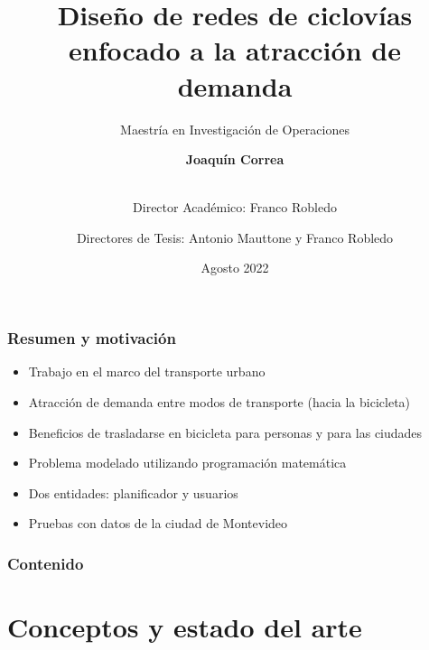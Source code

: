 \documentclass[aspectratio=43, 10pt]{beamer}
\title{Diseño de redes de ciclovías enfocado a la atracción de demanda}
\subtitle{Maestría en Investigación de Operaciones}
\author{
    \textbf{Joaquín Correa} \\\\
    \and
    Director Académico: Franco Robledo \\
    \and
    Directores de Tesis: Antonio Mauttone y Franco Robledo \\
}
\institute{Facultad de Ingeniería, Universidad de la República}
\date{Agosto 2022}
\begin{document}
\maketitle

\begin{frame}
    \frametitle{Resumen y motivación}

    \begin{itemize}
    \item{Trabajo en el marco del transporte urbano}
    \item{Atracción de demanda entre modos de transporte (hacia la bicicleta)}
    \item{Beneficios de trasladarse en bicicleta para personas y para las ciudades}
    \item{Problema modelado utilizando programación matemática}
    \item{Dos entidades: planificador y usuarios}
    \item{Pruebas con datos de la ciudad de Montevideo}
    \end{itemize}
\end{frame}

\begin{frame}
    \frametitle{Contenido}
    \tableofcontents
\end{frame}

\section{Conceptos y estado del arte}
\end{document}
